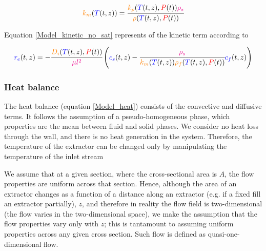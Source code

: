 \documentclass[../Article_Model_Parameters.tex]{subfiles}
\begin{document}
			{\footnotesize
				\begin{align}
					{\color{orange}k_m}({\color{blue}T}(t,z)) = \cfrac{{\color{orange}k_p}({\color{blue}T}(t,z),{\color{red}P}(t)) {\color{magenta}\rho_s}}{{\color{orange}\rho}({\color{blue}T}(t,z),{\color{red}P}(t))}
			\end{align} }
			
			Equation \ref{Model_kinetic_no_sat} represents of the kinetic term according to \citet{Reverchon1996}
			
			{\footnotesize
				\begin{equation}
					\label{Model_kinetic_no_sat}
					{\color{blue}r_e}(t,z) = -\cfrac{{\color{orange}D_i}({\color{blue}T}(t,z), {\color{red}P}(t))}{{\color{magenta} \mu l^2} }\left({\color{blue}c_s}(t,z) - \cfrac{{\color{magenta}\rho_s}}{{\color{orange}k_m}({\color{blue}T}(t,z)){\color{orange}\rho_f}({\color{blue}T}(t,z),{\color{red}P}(t))}  {\color{blue}c_f}(t,z) \right)
			\end{equation} }

			
		\subsubsection{Heat balance} \label{CH: heat_balance}
		
		\iffalse
		 {\color{red}
			The heat balance (equation \ref{Model_heat}) consists of the convective and diffusive terms. It follows the assumption of a pseudo-homogeneous phase, which properties are the mean between fluid and solid phases. We consider no heat loss through the wall, and there is no heat generation in the system. Therefore, the temperature of the extractor can be changed only by manipulating the temperature of the inlet stream %
			
			We assume that at a given section, where the cross-sectional area is $A$, the flow properties are uniform across that section. Hence, although the area of an extractor changes  as a function of a distance along an extractor (e.g. if a fixed fill an extractor partially), $z$, and therefore in reality the flow field is two-dimensional (the flow varies in the two-dimensional space), we make the assumption that the flow properties vary only with $z$; this is tantamount to assuming uniform properties across any given cross section. Such flow is defined as quasi-one-dimensional flow.
			
		}
		
\end{document}
